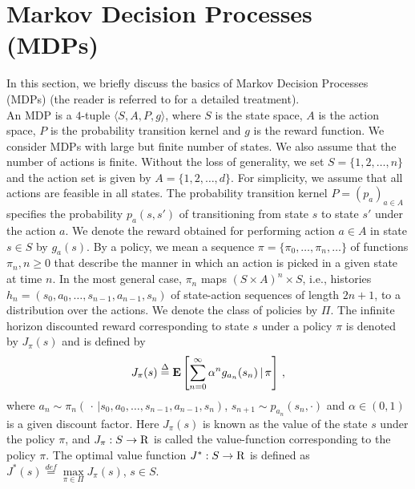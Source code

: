 \section{Markov Decision Processes (MDPs)}
In this section, we briefly discuss the basics of Markov Decision Processes (MDPs) (the reader is referred to \cite{BertB,Puter} for a detailed treatment).\\
An MDP is a $4$-tuple $\langle S,A,P,g\rangle$, where $S$ is the state space, $A$ is the action space, $P$ is the probability transition kernel and $g$ is the reward function. We consider MDPs with large but finite number of states. We also assume that the number of actions is finite.
Without the loss of generality, we set  $S=\{1,2,\ldots,n\}$  and the action set is given by $A=\{1,2,\ldots,d\}$. For simplicity, we assume that all actions are feasible in all states. 
The probability transition kernel $P= (p_a)_{a\in A}$ specifies the probability $p_a(s,s')$ of transitioning from state $s$ to state $s'$ under the action $a$. We denote the reward obtained for performing action $a\in A$ in state $s\in S$ by $g_a(s)$.
By a policy, we mean a sequence $\pi=\{\pi_0,\ldots,\pi_n,\ldots\}$ of functions $\pi_n, n\geq 0$ 
	that describe the manner in which an action is picked in a given state at time $n$. 
In the most general case, $\pi_n$ maps $(S \times A)^n \times S$, i.e., 
	histories $h_n =(s_0,a_0,\dots,s_{n-1},a_{n-1},s_n)$ 
	of state-action sequences of length $2n+1$, to a distribution over the actions. 
We denote the class of policies by $\Pi$. 
The infinite horizon discounted reward corresponding to state $s$ under a policy $\pi$ is denoted by $J_\pi(s)$ and is defined by
\begin{align}
J_\pi(s)\stackrel{\Delta}{=}\E\left[\sum_{n=0}^\infty \alpha^n g_{a_n}(s_n)\,\Large|\,\pi\right]\,,\nn
\end{align}
	where $a_{n} \sim \pi_n(\,\cdot\,|s_0,a_0,\dots,s_{n-1},a_{n-1},s_n)$, $s_{n+1} \sim p_{a_n}(s_n,\cdot)$ 
	and $\alpha \in (0,1)$ is a given discount factor. 
Here $J_\pi(s)$ is known as the value of the state $s$ under the policy $\pi$, and $J_\pi:S\to \mathrm{R}$ is 
 called the value-function corresponding to the policy $\pi$. 
 The optimal value function $J^*:S\to \mathrm{R}$ is defined as $J^*(s)\stackrel{def}{=}\underset{\pi \in \Pi}{\max} J_\pi(s)$, $s\in S$.
 
